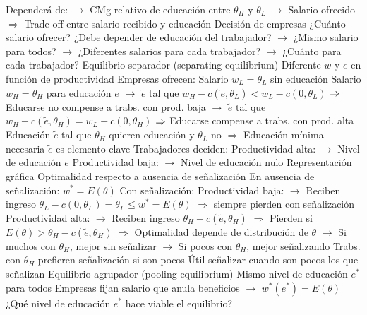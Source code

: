 \documentclass{nuevotema}
\begin{document}
\begin{esquemal}
				\4[] Dependerá de:
				\4[] $\to$ CMg relativo de educación entre $\theta_H$ y $\theta_L$
				\4[] $\to$ Salario ofrecido
				\4[] $\Rightarrow$ Trade-off entre salario recibido y educación
				\4 Decisión de empresas
				\4[] ¿Cuánto salario ofrecer?
				\4[] ¿Debe depender de educación del trabajador?
				\4[] $\to$ ¿Mismo salario para todos?
				\4[] $\to$ ¿Diferentes salarios para cada trabajador?
				\4[] $\to$ ¿Cuánto para cada trabajador?
			\3 Equilibrio separador (separating equilibrium)
				\4 Diferente $w$ y $e$ en función de productividad
				\4 Empresas ofrecen:
				\4[] Salario $w_L = \theta_L$ sin educación
				\4[] Salario $w_H = \theta_H$ para educación $\tilde{e}$
				\4[] $\to$ $\tilde{e}$ tal que $w_H - c(\tilde{e}, \theta_L) < w_L - c(0, \theta_L)$
				\4[] $\then$ Educarse no compense a trabs. con prod. baja
				\4[] $\to$ $\tilde{e}$ tal que $w_H - c(\tilde{e}, \theta_H) = w_L - c(0, \theta_H)$
				\4[] $\then$ Educarse compense a trabs. con prod. alta
				\4[] Educación $\tilde{e}$ tal que $\theta_H$ quieren educación y $\theta_L$ no
				\4[] $\Rightarrow$ Educación mínima necesaria $\tilde{e}$ es elemento clave
				\4 Trabajadores deciden:
				\4[] Productividad alta:
				\4[] $\to$ Nivel de educación $\tilde{e}$
				\4[] Productividad baja:
				\4[] $\to$ Nivel de educación nulo
				\4 Representación gráfica
				\4[] 
				\4 Optimalidad respecto a ausencia de señalización
				\4[] En ausencia de señalización:%
				\4[] $w^* = E(\theta)$
				\4[] Con señalización:
				\4[] Productividad baja:
				\4[] $\to$ Reciben ingreso $\theta_L - c(0, \theta_L) = \theta_L \leq w^* = E(\theta)$
				\4[] $\Rightarrow$ siempre pierden con señalización
				\4[] Productividad alta:
				\4[] $\to$ Reciben ingreso $\theta_H - c(\tilde{e}, \theta_H)$
				\4[] $\Rightarrow$ Pierden si $E(\theta) > \theta_H - c(\tilde{e}, \theta_H)$
				\4[] $\Rightarrow$ Optimalidad depende de distribución de $\theta$
				\4[] $\to$ Si muchos con $\theta_H$, mejor sin señalizar
				\4[] $\to$ Si pocos con $\theta_H$, mejor señalizando
				\4[$\then$] Trabs. con $\theta_H$ prefieren señalización si son pocos
				\4[$\Rightarrow$] Útil señalizar cuando son pocos los que señalizan
			\3 Equilibrio agrupador (pooling equilibrium)
				\4 Mismo nivel de educación $e^*$ para todos
				\4 Empresas fijan salario que anula beneficios
				\4[] $\to$ $w^*(e^*) = E(\theta)$
				\4 ¿Qué nivel de educación $e^*$ hace viable el equilibrio?

\end{esquemal}
\end{document}
